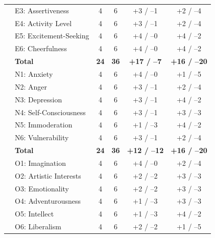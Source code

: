 \documentclass[11pt]{article}
\begin{document}
\begin{table}[h]
\begin{tabular}{llcccc}
 & E3: Assertiveness      & 4 & 6 & +3 / --1 & +2 / --4 \\
 & E4: Activity Level     & 4 & 6 & +3 / --1 & +2 / --4 \\
 & E5: Excitement-Seeking & 4 & 6 & +4 / --0 & +4 / --2 \\
 & E6: Cheerfulness       & 4 & 6 & +4 / --0 & +4 / --2 \\
\midrule
\rowcolor{lightgray}
\multirow{7}{*}{\textbf{Neuroticism (N)}} & \textbf{Total} & \textbf{24} & \textbf{36} & \textbf{+17 / --7} & \textbf{+16 / --20} \\
 & N1: Anxiety            & 4 & 6 & +4 / --0 & +1 / --5 \\
 & N2: Anger              & 4 & 6 & +3 / --1 & +2 / --4 \\
 & N3: Depression         & 4 & 6 & +3 / --1 & +4 / --2 \\
 & N4: Self-Consciousness & 4 & 6 & +3 / --1 & +3 / --3 \\
 & N5: Immoderation       & 4 & 6 & +1 / --3 & +4 / --2 \\
 & N6: Vulnerability      & 4 & 6 & +3 / --1 & +2 / --4 \\
\midrule
\rowcolor{lightgray}
\multirow{7}{*}{\textbf{Openness (O)}} & \textbf{Total} & \textbf{24} & \textbf{36} & \textbf{+12 / --12} & \textbf{+16 / --20} \\
 & O1: Imagination        & 4 & 6 & +4 / --0 & +2 / --4 \\
 & O2: Artistic Interests & 4 & 6 & +2 / --2 & +3 / --3 \\
 & O3: Emotionality       & 4 & 6 & +2 / --2 & +3 / --3 \\
 & O4: Adventurousness    & 4 & 6 & +1 / --3 & +3 / --3 \\
 & O5: Intellect          & 4 & 6 & +1 / --3 & +4 / --2 \\
 & O6: Liberalism         & 4 & 6 & +2 / --2 & +1 / --5 \\
\bottomrule
\end{tabular}
\end{table}
\end{document}
